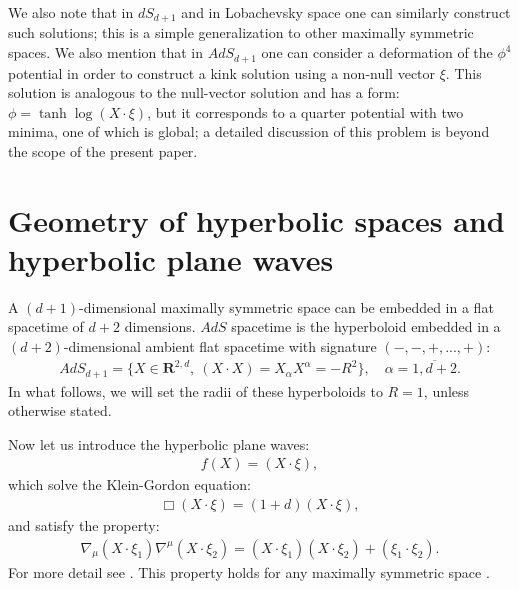 \documentclass{article}
\begin{document}
We also note that in $dS_{d+1}$ and in Lobachevsky space one can similarly construct such solutions; this is a simple generalization to other maximally symmetric spaces. We also mention that in $AdS_{d+1}$ one can consider a deformation of the $\phi^4$ potential in order to construct a kink solution using a non-null vector $\xi$. This solution is analogous to the null-vector solution and has a form: $\phi=\tanh \log (X\cdot \xi)$, but it corresponds to a quarter potential with two minima, one of which is global; a detailed discussion of this problem is beyond the scope of the present paper.

\section{Geometry of hyperbolic spaces and hyperbolic plane waves}

A $(d+1)$-dimensional maximally symmetric space can be embedded in a flat spacetime of $d+2$ dimensions. $AdS$ spacetime is the hyperboloid embedded in a $(d+2)$-dimensional ambient flat spacetime with signature $(-,-,+,...,+)$:
\begin{align}
AdS_{d+1}=\{ X  \in \mathbf{R}^{2,d}, \ (X\cdot X)=X_\alpha X^\alpha =-R^2 \}, \quad \alpha = \overline{1,d+2}.
\end{align}
In what follows, we will set the radii of these hyperboloids to $R = 1$, unless otherwise stated.

Now let us introduce the hyperbolic plane waves:
\begin{align}
    f(X) = (X\cdot \xi),
\end{align}
which solve the Klein-Gordon equation:
\begin{align}
\label{box12}
   \Box (X \cdot \xi)=(1+ d)  (X \cdot\xi),
\end{align}
and satisfy the property:
\begin{align}
    \nabla_\mu (X\cdot \xi_1 ) \nabla^\mu (X \cdot \xi_2) =  (X\cdot \xi_1 ) (X \cdot \xi_2)+ (\xi_1 \cdot \xi_2).
    \label{waveprop}
\end{align}
For more detail see \cite{Akhmedov:2026msi}. This property holds for any maximally symmetric space \cite{Bros:1994dn,Bros:1995js,Moschella:2025lqy,Moschella:2007zza,Akhmedova:2019bau}.
\end{document}
